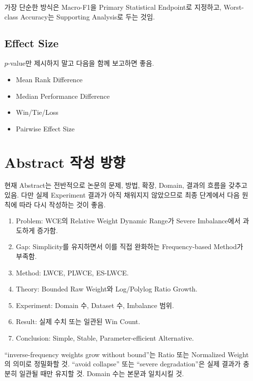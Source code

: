 \documentclass[11pt,a4paper]{article}
\begin{document}
가장 단순한 방식은 Macro-F1을 Primary Statistical Endpoint로 지정하고, Worst-class Accuracy는 Supporting Analysis로 두는 것임.

\subsection{Effect Size}

\(p\)-value만 제시하지 말고 다음을 함께 보고하면 좋음.

\begin{itemize}
\item Mean Rank Difference
\item Median Performance Difference
\item Win/Tie/Loss
\item Pairwise Effect Size
\end{itemize}

\section{Abstract 작성 방향}

현재 Abstract는 전반적으로 논문의 문제, 방법, 확장, Domain, 결과의 흐름을 갖추고 있음. 다만 실제 Experiment 결과가 아직 채워지지 않았으므로 최종 단계에서 다음 원칙에 따라 다시 작성하는 것이 좋음.

\begin{enumerate}
\item Problem: WCE의 Relative Weight Dynamic Range가 Severe Imbalance에서 과도하게 증가함.
\item Gap: Simplicity를 유지하면서 이를 직접 완화하는 Frequency-based Method가 부족함.
\item Method: LWCE, PLWCE, ES-LWCE.
\item Theory: Bounded Raw Weight와 Log/Polylog Ratio Growth.
\item Experiment: Domain 수, Dataset 수, Imbalance 범위.
\item Result: 실제 수치 또는 일관된 Win Count.
\item Conclusion: Simple, Stable, Parameter-efficient Alternative.
\end{enumerate}

\begin{tcolorbox}[title=Abstract에서 수정할 표현]
``inverse-frequency weights grow without bound''는 Ratio 또는 Normalized Weight의 의미로 정밀화할 것. ``avoid collapse'' 또는 ``severe degradation''은 실제 결과가 충분히 일관될 때만 유지할 것. Domain 수는 본문과 일치시킬 것.
\end{tcolorbox}
\end{document}
